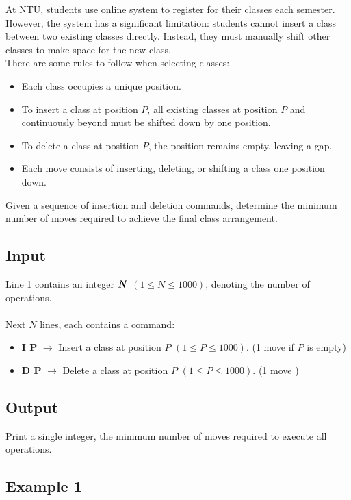 \documentclass[12pt,a4paper]{article}
\begin{document}
\noindent
At NTU, students use online system to register for their classes each semester. However, the system has a significant limitation: students cannot insert a class between two existing classes directly. Instead, they must manually shift other classes to make space for the new class.
\\
\noindent
There are some rules to follow when selecting classes:
\begin{itemize}
    \item Each class occupies a unique position.
    \item To insert a class at position \textbf{\( P \)}, all existing classes at position \textbf{\( P \)} and continuously beyond must be shifted down by one position.
    \item To delete a class at position \textbf{\( P \)}, the position remains empty, leaving a gap.
    \item Each move consists of inserting, deleting, or shifting a class one position down.
\end{itemize}

\noindent
Given a sequence of insertion and deletion commands, determine the minimum number of moves required to achieve the final class arrangement.

\subsection*{\fontsize{16}{12}Input}
Line 1 contains an integer \(\textbf{\textit{N}}\) \((1 \leq N \leq 1000)\), denoting the number of operations.
\\\\
\noindent
Next \textbf{\( N \)} lines, each contains a command:
    \begin{itemize}
        \item \textbf{I P} $\rightarrow$ Insert a class at position \( P \) \((1 \leq P \leq 1000)\). (1 move if $P$ is empty)
        \item \textbf{D P} $\rightarrow$ Delete a class at position \( P \) \((1 \leq P \leq 1000)\). (1 move )
    \end{itemize}

\subsection*{\fontsize{16}{12}Output}
Print a single integer, the minimum number of moves required to execute all operations.
\subsection*{\fontsize{16}{12}Example 1}
\end{document}
